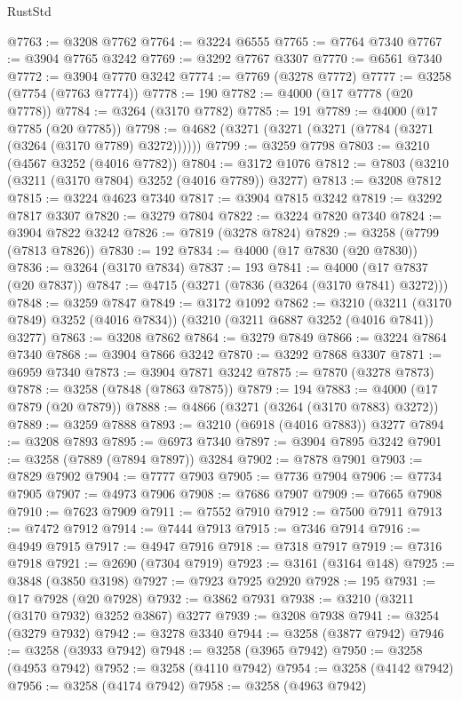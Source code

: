 \begin{lexlean}{RustStd}
\begin{coremodule}
@7763 := @3208 @7762
@7764 := @3224 @6555
@7765 := @7764 @7340
@7767 := @3904 @7765 @3242
@7769 := @3292 @7767 @3307
@7770 := @6561 @7340
@7772 := @3904 @7770 @3242
@7774 := @7769 (@3278 @7772)
@7777 := @3258 (@7754 (@7763 @7774))
@7778 := 190
@7782 := @4000 (@17 @7778 (@20 @7778))
@7784 := @3264 (@3170 @7782)
@7785 := 191
@7789 := @4000 (@17 @7785 (@20 @7785))
@7798 := @4682 (@3271 (@3271 (@3271 (@7784 (@3271 (@3264 (@3170 @7789) @3272))))))
@7799 := @3259 @7798
@7803 := @3210 (@4567 @3252 (@4016 @7782))
@7804 := @3172 @1076
@7812 := @7803 (@3210 (@3211 (@3170 @7804) @3252 (@4016 @7789)) @3277)
@7813 := @3208 @7812
@7815 := @3224 @4623 @7340
@7817 := @3904 @7815 @3242
@7819 := @3292 @7817 @3307
@7820 := @3279 @7804
@7822 := @3224 @7820 @7340
@7824 := @3904 @7822 @3242
@7826 := @7819 (@3278 @7824)
@7829 := @3258 (@7799 (@7813 @7826))
@7830 := 192
@7834 := @4000 (@17 @7830 (@20 @7830))
@7836 := @3264 (@3170 @7834)
@7837 := 193
@7841 := @4000 (@17 @7837 (@20 @7837))
@7847 := @4715 (@3271 (@7836 (@3264 (@3170 @7841) @3272)))
@7848 := @3259 @7847
@7849 := @3172 @1092
@7862 := @3210
    (@3211 (@3170 @7849) @3252 (@4016 @7834))
    (@3210 (@3211 @6887 @3252 (@4016 @7841)) @3277)
@7863 := @3208 @7862
@7864 := @3279 @7849
@7866 := @3224 @7864 @7340
@7868 := @3904 @7866 @3242
@7870 := @3292 @7868 @3307
@7871 := @6959 @7340
@7873 := @3904 @7871 @3242
@7875 := @7870 (@3278 @7873)
@7878 := @3258 (@7848 (@7863 @7875))
@7879 := 194
@7883 := @4000 (@17 @7879 (@20 @7879))
@7888 := @4866 (@3271 (@3264 (@3170 @7883) @3272))
@7889 := @3259 @7888
@7893 := @3210 (@6918 (@4016 @7883)) @3277
@7894 := @3208 @7893
@7895 := @6973 @7340
@7897 := @3904 @7895 @3242
@7901 := @3258 (@7889 (@7894 @7897)) @3284
@7902 := @7878 @7901
@7903 := @7829 @7902
@7904 := @7777 @7903
@7905 := @7736 @7904
@7906 := @7734 @7905
@7907 := @4973 @7906
@7908 := @7686 @7907
@7909 := @7665 @7908
@7910 := @7623 @7909
@7911 := @7552 @7910
@7912 := @7500 @7911
@7913 := @7472 @7912
@7914 := @7444 @7913
@7915 := @7346 @7914
@7916 := @4949 @7915
@7917 := @4947 @7916
@7918 := @7318 @7917
@7919 := @7316 @7918
@7921 := @2690 (@7304 @7919)
@7923 := @3161 (@3164 @148)
@7925 := @3848 (@3850 @3198)
@7927 := @7923 @7925 @2920
@7928 := 195
@7931 := @17 @7928 (@20 @7928)
@7932 := @3862 @7931
@7938 := @3210 (@3211 (@3170 @7932) @3252 @3867) @3277
@7939 := @3208 @7938
@7941 := @3254 (@3279 @7932)
@7942 := @3278 @3340
@7944 := @3258 (@3877 @7942)
@7946 := @3258 (@3933 @7942)
@7948 := @3258 (@3965 @7942)
@7950 := @3258 (@4953 @7942)
@7952 := @3258 (@4110 @7942)
@7954 := @3258 (@4142 @7942)
@7956 := @3258 (@4174 @7942)
@7958 := @3258 (@4963 @7942)

\end{coremodule}
\end{lexlean}

